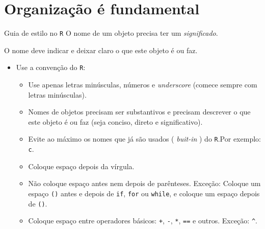 \documentclass[
  10pt,
  ignorenonframetext,
]{beamer}
\providecommand{\tightlist}{%
  \setlength{\itemsep}{0pt}\setlength{\parskip}{0pt}}\usepackage{longtable,booktabs,array}
\begin{document}
\hypertarget{organizauxe7uxe3o-uxe9-fundamental}{%
\section{Organização é
fundamental}\label{organizauxe7uxe3o-uxe9-fundamental}}

\begin{frame}[fragile]{Guia de estilo no \texttt{R}}
\protect\hypertarget{guia-de-estilo-no-r}{}
O nome de um objeto precisa ter um \emph{significado}.

O nome deve indicar e deixar claro o que este objeto é ou faz.

\begin{itemize}
\tightlist
\item
  Use a convenção do \texttt{R}:

  \begin{itemize}
  \tightlist
  \item
    Use apenas letras minúsculas, números e \emph{underscore} (comece
    sempre com letras minúsculas).
  \item
    Nomes de objetos precisam ser substantivos e precisam descrever o
    que este objeto é ou faz (seja conciso, direto e significativo).
  \item
    Evite ao máximo os nomes que já são usados ( \emph{buit-in} ) do
    \texttt{R}.Por exemplo: \texttt{c}.
  \item
    Coloque espaço depois da vírgula.
  \item
    Não coloque espaço antes nem depois de parênteses. Exceção: Coloque
    um espaço \texttt{()} antes e depois de \texttt{if}, \texttt{for} ou
    \texttt{while}, e coloque um espaço depois de \texttt{()}.
  \item
    Coloque espaço entre operadores básicos: \texttt{+}, \texttt{-},
    \texttt{*}, \texttt{==} e outros. Exceção: \texttt{\^{}}.
  \end{itemize}
\end{itemize}
\end{frame}
\end{document}

